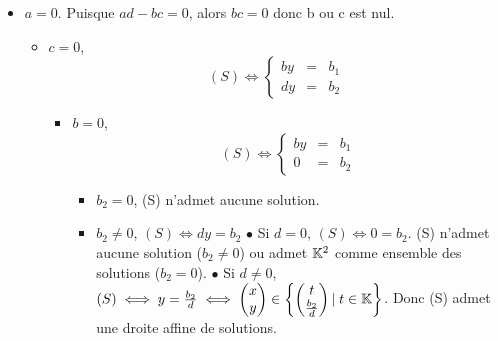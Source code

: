 \documentclass{article}
\begin{document}
\begin{question_kholle}
\begin{itemize}[label=$\bullet$ Supposons]
    \item $a = 0$. Puisque $ad - bc = 0$, alors $bc = 0$ donc b ou c est nul.

          \begin{itemize}[label=$\bullet$ Si]
            \item $c = 0$,
                  \begin{equation*}
                    (S) \iff
                    \left\{ \begin{array}{ccc}
                      by & = & b_1 \\
                      dy & = & b_2
                    \end{array} \right.
                  \end{equation*}

                  \begin{itemize}[label=$\bullet$ Si]
                    \item $b = 0$,
                          \begin{equation*}
                            (S) \iff
                            \left\{ \begin{array}{ccc}
                              by & = & b_1 \\
                              0  & = & b_2
                            \end{array} \right.
                          \end{equation*}
                          \begin{itemize}[label=$\bullet$ Si]
                            \item $b_2 = 0$, (S) n'admet aucune solution.
                            \item $b_2 \neq 0$, $(S) \iff dy = b_2$
                                  \subitem$\bullet$ Si $d = 0$, $(S) \iff 0 = b_2$. (S) n'admet aucune solution ($b_2 \neq 0$) ou admet $\mathbb K^2$ comme ensemble des solutions ($b_2 = 0$).
                                  \subitem$\bullet$ Si $d \neq 0$, $(S) \iff y = \frac{b_2}{d} \iff \begin{pmatrix} x \\ y \end{pmatrix} \in \begin{Bmatrix} \begin{pmatrix} t \\ \frac{b_2}{d} \end{pmatrix} |\; t \in \mathbb K \end{Bmatrix}$. Donc (S) admet une droite affine de solutions.

\end{itemize}
\end{itemize}
\end{itemize}
\end{itemize}
\end{question_kholle}
\end{document}

